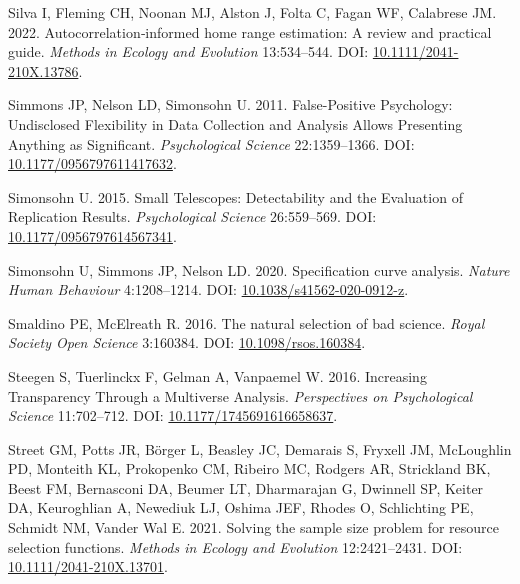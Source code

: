 \documentclass[10pt,a4paper]{article}
\newlength{\cslhangindent}
\newlength{\cslentryspacingunit} %
\newenvironment{CSLReferences}[2] %
 {%
  \setlength{\parindent}{0pt}
  \ifodd #1
  \let\oldpar\par
  \def\par{\hangindent=\cslhangindent\oldpar}
  \fi
  \setlength{\parskip}{#2\cslentryspacingunit}
 }%
 {}
\begin{document}
\begin{CSLReferences}{1}{0}
\leavevmode{}%
Silva I, Fleming CH, Noonan MJ, Alston J, Folta C, Fagan WF, Calabrese JM. 2022. Autocorrelation‐informed home range estimation: {A} review and practical guide. \emph{Methods in Ecology and Evolution} 13:534--544. DOI: \href{https://doi.org/10.1111/2041-210X.13786}{10.1111/2041-210X.13786}.

\leavevmode{}%
Simmons JP, Nelson LD, Simonsohn U. 2011. False-{Positive} {Psychology}: {Undisclosed} {Flexibility} in {Data} {Collection} and {Analysis} {Allows} {Presenting} {Anything} as {Significant}. \emph{Psychological Science} 22:1359--1366. DOI: \href{https://doi.org/10.1177/0956797611417632}{10.1177/0956797611417632}.

\leavevmode{}%
Simonsohn U. 2015. Small {Telescopes}: {Detectability} and the {Evaluation} of {Replication} {Results}. \emph{Psychological Science} 26:559--569. DOI: \href{https://doi.org/10.1177/0956797614567341}{10.1177/0956797614567341}.

\leavevmode{}%
Simonsohn U, Simmons JP, Nelson LD. 2020. Specification curve analysis. \emph{Nature Human Behaviour} 4:1208--1214. DOI: \href{https://doi.org/10.1038/s41562-020-0912-z}{10.1038/s41562-020-0912-z}.

\leavevmode{}%
Smaldino PE, McElreath R. 2016. The natural selection of bad science. \emph{Royal Society Open Science} 3:160384. DOI: \href{https://doi.org/10.1098/rsos.160384}{10.1098/rsos.160384}.

\leavevmode{}%
Steegen S, Tuerlinckx F, Gelman A, Vanpaemel W. 2016. Increasing {Transparency} {Through} a {Multiverse} {Analysis}. \emph{Perspectives on Psychological Science} 11:702--712. DOI: \href{https://doi.org/10.1177/1745691616658637}{10.1177/1745691616658637}.

\leavevmode{}%
Street GM, Potts JR, Börger L, Beasley JC, Demarais S, Fryxell JM, McLoughlin PD, Monteith KL, Prokopenko CM, Ribeiro MC, Rodgers AR, Strickland BK, Beest FM, Bernasconi DA, Beumer LT, Dharmarajan G, Dwinnell SP, Keiter DA, Keuroghlian A, Newediuk LJ, Oshima JEF, Rhodes O, Schlichting PE, Schmidt NM, Vander Wal E. 2021. Solving the sample size problem for resource selection functions. \emph{Methods in Ecology and Evolution} 12:2421--2431. DOI: \href{https://doi.org/10.1111/2041-210X.13701}{10.1111/2041-210X.13701}.


\end{CSLReferences}
\end{document}
